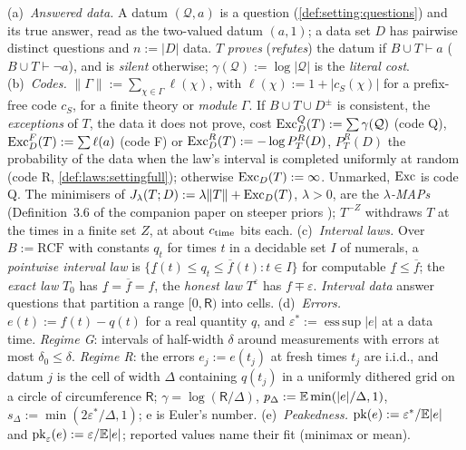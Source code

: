 \begin{definition}\label{def:laws:setting}
(a)~\emph{Answered data.} A datum $(\mathcal Q,a)$ is a question (\cref{def:setting:questions}) and its true answer, read as the two-valued datum $(a,1)$; a data set $D$ has pairwise distinct questions and $n:=\lvert D\rvert$ data. $T$ \emph{proves} (\emph{refutes}) the datum if $B\cup T\vdash a$ ($B\cup T\vdash\neg a$), and is \emph{silent} otherwise; $\gamma(\mathcal Q):=\log\lvert\mathcal Q\rvert$ is the \emph{literal cost}. (b)~\emph{Codes.} $\lVert\Gamma\rVert:=\sum_{\chi\in\Gamma}\ell(\chi)$, with $\ell(\chi):=1+\lvert c_S(\chi)\rvert$ for a prefix-free code $c_S$, for a finite theory or \emph{module} $\Gamma$. If $B\cup T\cup D^\pm$ is consistent, the \emph{exceptions} of $T$, the data it does not prove, cost $\mathrm{Exc}^Q_D(T):=\sum\gamma(\mathcal Q)$ (code Q), $\mathrm{Exc}^F_D(T):=\sum\ell(a)$ (code F) or $\mathrm{Exc}^R_D(T):=-\log P^R_T(D)$, $P^R_T(D)$ the probability of the data when the law's interval is completed uniformly at random (code R, \cref{def:laws:settingfull}); otherwise $\mathrm{Exc}_D(T):=\infty$. Unmarked, $\mathrm{Exc}$ is code Q. The minimisers of $J_\lambda(T;D):=\lambda\lVert T\rVert+\mathrm{Exc}_D(T)$, $\lambda>0$, are the \emph{$\lambda$-MAPs} (Definition~3.6 of the companion paper on steeper priors \citep{claudeSFI2026steeper}); $T^{-Z}$ withdraws $T$ at the times in a finite set $Z$, at about $c_{\rm time}$ bits each. (c)~\emph{Interval laws.} Over $B:=\mathrm{RCF}$ with constants $q_t$ for times $t$ in a decidable set $I$ of numerals, a \emph{pointwise interval law} is $\{\underline f(t)\le q_t\le\overline f(t):t\in I\}$ for computable $\underline f\le\overline f$; the \emph{exact law} $T_0$ has $\underline f=\overline f=f$, the \emph{honest law} $T^\varepsilon$ has $f\mp\varepsilon$. \emph{Interval data} answer questions that partition a range $[0,\mathsf R)$ into cells. (d)~\emph{Errors.} $e(t):=f(t)-q(t)$ for a real quantity $q$, and $\varepsilon^*:=\operatorname{ess\,sup}\lvert e\rvert$ at a data time. \emph{Regime G}: intervals of half-width $\delta$ around measurements with errors at most $\delta_0\le\delta$. \emph{Regime R}: the errors $e_j:=e(t_j)$ at fresh times $t_j$ are i.i.d., and datum $j$ is the cell of width $\Delta$ containing $q(t_j)$ in a uniformly dithered grid on a circle of circumference $\mathsf R$; $\gamma=\log(\mathsf R/\Delta)$, $p_\Delta:=\mathbb{E}\min(\lvert e\rvert/\Delta,1)$, $s_\Delta:=\min(2\varepsilon^*/\Delta,1)$; $\mathrm e$ is Euler's number. (e)~\emph{Peakedness.} $\mathrm{pk}(e):=\varepsilon^*/\mathbb{E}\lvert e\rvert$ and $\mathrm{pk}_\varepsilon(e):=\varepsilon/\mathbb{E}\lvert e\rvert$; reported values name their fit (minimax or mean).
\end{definition}

